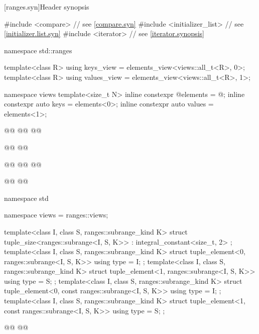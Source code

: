 \documentclass{wg21}
\begin{document}
[ranges.syn]{Header  synopsis}
%
\begin{codeblock}
#include <compare>              // see \ref{compare.syn}
#include <initializer_list>     // see \ref{initializer.list.syn}
#include <iterator>             // see \ref{iterator.synopsis}

namespace std::ranges {
    template<class R>
    using keys_view = elements_view<views::all_t<R>, 0>;
    template<class R>
    using values_view = elements_view<views::all_t<R>, 1>;

    namespace views {
        template<size_t N>
        inline constexpr @\unspec@ elements = @\unspec@ ;
        inline constexpr auto keys = elements<0>;
        inline constexpr auto values = elements<1>;
    }

    @@
    @@
    @@

    @@
    @@

    @@
    @@
    @@

    @@
    @@
}
namespace std {
    namespace views = ranges::views;

    template<class I, class S, ranges::subrange_kind K>
    struct tuple_size<ranges::subrange<I, S, K>>
    : integral_constant<size_t, 2> {};
    template<class I, class S, ranges::subrange_kind K>
    struct tuple_element<0, ranges::subrange<I, S, K>> {
        using type = I;
    };
    template<class I, class S, ranges::subrange_kind K>
    struct tuple_element<1, ranges::subrange<I, S, K>> {
        using type = S;
    };
    template<class I, class S, ranges::subrange_kind K>
    struct tuple_element<0, const ranges::subrange<I, S, K>> {
        using type = I;
    };
    template<class I, class S, ranges::subrange_kind K>
    struct tuple_element<1, const ranges::subrange<I, S, K>> {
        using type = S;
    };

    @@
    @@
}

\end{codeblock}
\end{document}
